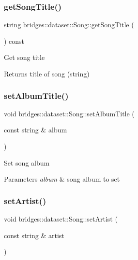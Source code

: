 \subsubsection{\texorpdfstring{get\+Song\+Title()}{getSongTitle()}}
{\footnotesize\ttfamily string bridges\+::dataset\+::\+Song\+::get\+Song\+Title (\begin{DoxyParamCaption}{ }\end{DoxyParamCaption}) const\hspace{0.3cm}{\ttfamily [inline]}}

Get song title \begin{DoxyReturn}{Returns}
title of song (string) 
\end{DoxyReturn}
\mbox{\label{classbridges_1_1dataset_1_1_song_aab02dcdc8f5332ff18e5127210ba17dc}} 
\subsubsection{\texorpdfstring{set\+Album\+Title()}{setAlbumTitle()}}
{\footnotesize\ttfamily void bridges\+::dataset\+::\+Song\+::set\+Album\+Title (\begin{DoxyParamCaption}\item[{const string \&}]{album }\end{DoxyParamCaption})\hspace{0.3cm}{\ttfamily [inline]}}

Set song album 
\begin{DoxyParams}{Parameters}
{\em album} & song album to set \\
\hline
\end{DoxyParams}
\mbox{\label{classbridges_1_1dataset_1_1_song_ab37a93674d0e4b219d24c14cfc2b0756}} 
\subsubsection{\texorpdfstring{set\+Artist()}{setArtist()}}
{\footnotesize\ttfamily void bridges\+::dataset\+::\+Song\+::set\+Artist (\begin{DoxyParamCaption}\item[{const string \&}]{artist }\end{DoxyParamCaption})\hspace{0.3cm}{\ttfamily [inline]}}


